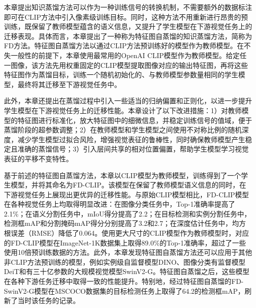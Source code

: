 本章提出知识蒸馏方法可以作为一种训练信号的转换机制，不需要额外的数据标注即可在CLIP方法中引入像素级训练目标。同时，这种方法不用重新进行昂贵的预训练，既保留了教师模型蕴含的语义信息，又提升了学生模型在下游视觉任务上的迁移表现。具体而言，本章提出了一种称为特征图自蒸馏的知识蒸馏方法，简称为FD方法。特征图自蒸馏方法以通过CLIP方法预训练好的模型作为教师模型。在不失一般性的前提下，本章使用最常用的OpenAI CLIP\cite{radford2021learning}模型作为教师模型。给定任一图像，该方法先用权重固定的CLIP模型提取图像对应的输出特征图，再将这些特征图作为蒸馏目标，训练一个随机初始化的、与教师模型参数量相同的学生模型，最终将其迁移至下游视觉任务中。

此外，本章还提出在蒸馏过程中引入一些适当的归纳偏置和正则化，以进一步提升学生模型在下游视觉任务上的迁移性能。本章设计了以下改进措施：1）对教师模型的特征图进行标准化，放大特征图中的细微信息，并稳定训练信号的值域，便于蒸馏阶段的超参数调整；2）在教师模型和学生模型之间使用不对称比例的随机深度，减少学生模型过拟合风险，增强视觉表征的鲁棒性，同时确保教师模型产生稳定且准确的蒸馏信号；3）引入层间共享的相对位置偏置，帮助学生模型学习视觉表征的平移不变特性。

基于前述的特征图自蒸馏方法，本章以CLIP模型为教师模型，训练得到了一个学生模型，并将其命名为FD-CLIP。该模型在保留了教师模型语义信息的同时，在下游视觉任务上展现出更优异的迁移性能。与原始CLIP模型相比，FD-CLIP模型在各种视觉任务上均取得明显改进：在图像分类任务中，Top-1准确率提高了2.1\%；在语义分割任务中，mIoU得分提高了2.2；在目标检测和实例分割任务中，检测框mAP和分割掩码mAP得分分别提高了3.2和2.7；在深度估计任务中，均方根误差（RMSE）降低了0.064。使用更大尺寸的CLIP模型作为教师模型时，对应的FD-CLIP模型在ImageNet-1K数据集上取得89.0\%的Top-1准确率，超过了一些使用10倍预训练数据的方法。此外，本章发现特征图自蒸馏方法还可以应用于其他非CLIP方法预训练的模型，例如实例级自监督模型DINO\cite{dino}、图像分类有监督模型DeiT\cite{deit}和有三十亿参数的大规模视觉模型SwinV2-G\cite{swinv2cvpr}。特征图自蒸馏之后，这些模型在各种下游任务迁移中取得一致的性能提升。特别地，经过特征图自蒸馏的FD-SwinV2-G模型在MSCOCO数据集\cite{chen2015microsoft}的目标检测任务上取得了64.2的检测框mAP，刷新了当时该任务的记录。

